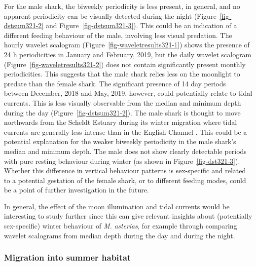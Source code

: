 \documentclass[
  authoryear,
  review,
  3p]{elsarticle}
\begin{document}
For the male shark, the biweekly periodicity is less present, in
general, and no apparent periodicity can be visually detected during the
night (Figure~\ref{fig-dstsum321-2} and Figure~\ref{fig-dstsum321-3}).
This could be an indication of a different feeding behaviour of the
male, involving less visual predation. The hourly wavelet scalogram
(Figure~\ref{fig-waveletresults321-1}) shows the presence of 24 h
periodicities in January and February, 2019, but the daily wavelet
scalogram (Figure~\ref{fig-waveletresults321-2}) does not contain
significantly present monthly periodicities. This suggests that the male
shark relies less on the moonlight to predate than the female shark. The
significant presence of 14 day periods between December, 2018 and May,
2019, however, could potentially relate to tidal currents. This is less
visually observable from the median and minimum depth during the day
(Figure~\ref{fig-dstsum321-2}). The male shark is thought to move
northwards from the Scheldt Estuary during its winter migration where
tidal currents are generally less intense than in the English Channel
\citep{salomon_1993, arnold_1994}. This could be a potential explanation
for the weaker biweekly periodicity in the male shark's median and
minimum depth. The male does not show clearly detectable periods with
pure resting behaviour during winter (as shown in
Figure~\ref{fig-dst321-3}). Whether this difference in vertical
behaviour patterns is sex-specific and related to a potential gestation
of the female shark, or to different feeding modes, could be a point of
further investigation in the future.

In general, the effect of the moon illumination and tidal currents would
be interesting to study further since this can give relevant insights
about (potentially sex-specific) winter behaviour of \emph{M. asterias},
for example through comparing wavelet scalograms from median depth
during the day and during the night.

\hypertarget{sec-disc-summermig}{%
\subsubsection{Migration into summer habitat}\label{sec-disc-summermig}}
\end{document}
